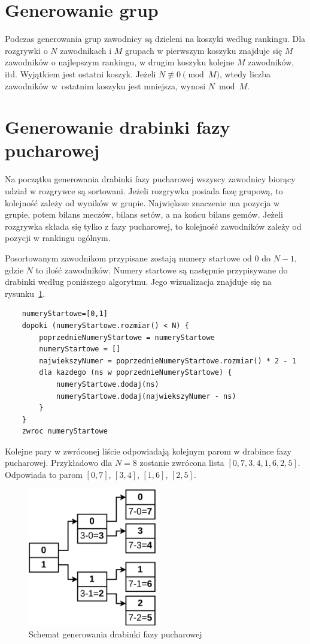\documentclass[shortabstract]{iithesis}
\begin{document}
\section{Generowanie grup}
Podczas generowania grup zawodnicy są dzieleni na koszyki według rankingu.
Dla rozgrywki o $N$ zawodnikach i $M$ grupach w pierwszym koszyku znajduje się $M$ zawodników o najlepszym rankingu, w drugim koszyku kolejne $M$ zawodników, itd.
Wyjątkiem jest ostatni koszyk. Jeżeli $N \not\equiv 0 \pmod{M}$, wtedy liczba zawodników w~ostatnim koszyku jest mniejsza, wynosi $N\bmod{M}$.
\section{Generowanie drabinki fazy pucharowej}
Na początku generowania drabinki fazy pucharowej wszyscy zawodnicy biorący udział w rozgrywce są sortowani.
Jeżeli rozgrywka posiada fazę grupową, to kolejność zależy od wyników w grupie.
Największe znaczenie ma pozycja w grupie, potem bilans meczów, bilans setów, a na końcu bilans gemów.
Jeżeli rozgrywka składa się tylko z fazy pucharowej, to kolejność zawodników zależy od pozycji w rankingu ogólnym.

Posortowanym zawodnikom przypisane zostają numery startowe od $0$ do $N-1$, gdzie $N$ to ilość zawodników.
Numery startowe są następnie przypisywane do drabinki według poniższego algorytmu. Jego wizualizacja znajduje się na rysunku~\ref{fig:knockout_bracket_generation}.
\begin{lstlisting}
    numeryStartowe=[0,1]
    dopoki (numeryStartowe.rozmiar() < N) {
        poprzednieNumeryStartowe = numeryStartowe
        numeryStartowe = []
        najwiekszyNumer = poprzednieNumeryStartowe.rozmiar() * 2 - 1
        dla kazdego (ns w poprzednieNumeryStartowe) {
            numeryStartowe.dodaj(ns)
            numeryStartowe.dodaj(najwiekszyNumer - ns)
        }
    }
    zwroc numeryStartowe
\end{lstlisting}
Kolejne pary w zwróconej liście odpowiadają kolejnym parom w drabince fazy pucharowej.
Przykładowo dla $N=8$ zostanie zwrócona lista $[0, 7, 3, 4, 1, 6, 2, 5]$. Odpowiada to parom
$[0, 7]$, $[3, 4]$, $[1, 6]$, $[2, 5]$.
\begin{figure}[H]
    \centering
    \includegraphics[width=0.5\textwidth]{assets/generowanie_drabinki.png}
    \caption{Schemat generowania drabinki fazy pucharowej}
    \label{fig:knockout_bracket_generation}
\end{figure}
\end{document}
